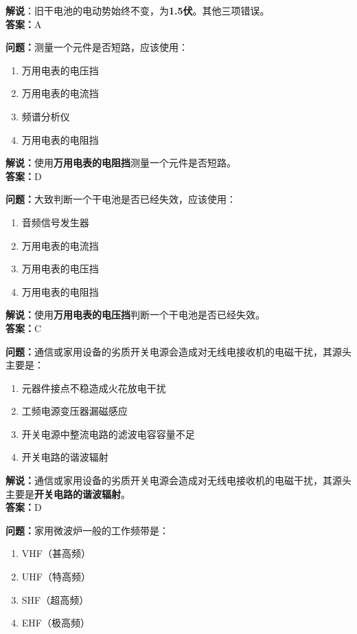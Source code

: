 \textbf{解说}：旧干电池的电动势始终不变，为\textbf{1.5伏}。其他三项错误。\\\textbf{答案：}A


\textbf{问题：}测量一个元件是否短路，应该使用：

\begin{enumerate}[label=\Alph*), leftmargin=1.5cm]
	\item 万用电表的电压挡
	\item 万用电表的电流挡
	\item 频谱分析仪
	\item 万用电表的电阻挡
\end{enumerate}

\textbf{解说：}使用\textbf{万用电表的电阻挡}测量一个元件是否短路。\\\textbf{答案：}D


\textbf{问题：}大致判断一个干电池是否已经失效，应该使用：

\begin{enumerate}[label=\Alph*), leftmargin=1.5cm]
	\item 音频信号发生器
	\item 万用电表的电流挡
	\item 万用电表的电压挡
	\item 万用电表的电阻挡
\end{enumerate}

\textbf{解说：}使用\textbf{万用电表的电压挡}判断一个干电池是否已经失效。\\\textbf{答案：}C


\textbf{问题：}通信或家用设备的劣质开关电源会造成对无线电接收机的电磁干扰，其源头主要是：

\begin{enumerate}[label=\Alph*), leftmargin=1.5cm]
	\item 元器件接点不稳造成火花放电干扰
	\item 工频电源变压器漏磁感应
	\item 开关电源中整流电路的滤波电容容量不足
	\item 开关电路的谐波辐射
\end{enumerate}

\textbf{解说：}通信或家用设备的劣质开关电源会造成对无线电接收机的电磁干扰，其源头主要是\textbf{开关电路的谐波辐射}。\\\textbf{答案：}D


\textbf{问题：}家用微波炉一般的工作频带是：

\begin{enumerate}[label=\Alph*), leftmargin=1.5cm]
	\item VHF（甚高频）
	\item UHF（特高频）
	\item SHF（超高频）
	\item EHF（极高频）
\end{enumerate}

